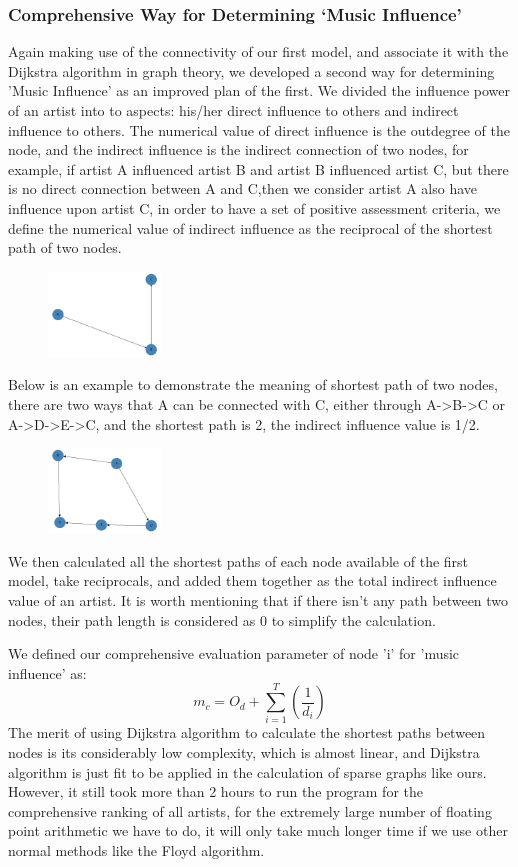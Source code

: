 \documentclass[12pt]{article}
\begin{document}
\subsubsection{Comprehensive Way for Determining `Music Influence'}\quad \;
Again making use of the connectivity of our first model, and associate it with the Dijkstra algorithm in graph theory, we developed a second way for determining 'Music Influence' as an improved plan of the first.
We divided the influence power of an artist into to aspects: his/her direct influence to others and indirect influence to others. The numerical value of direct influence is the outdegree of the node, and the indirect influence is the indirect connection of two nodes, for example, if artist A influenced artist B and artist B influenced artist C, but there is no direct connection between A and C,then we consider artist A also have influence upon artist C, in order to have a set of positive assessment criteria, we define the numerical value of indirect influence as the reciprocal of the shortest path of two nodes.
\begin{figure}[h]
\centering
\includegraphics[width=3cm]{simple graph.png}
\end{figure}


Below is an example to demonstrate the meaning of shortest path of two nodes, there are two ways that A can be connected with C, either through A->B->C or A->D->E->C, and the shortest path is 2, the indirect influence value is 1/2.
\begin{figure}[h]
\centering
\includegraphics[width=3cm]{simple graph2.png}
\end{figure}
We then calculated all the shortest paths of each node available of the first model, take reciprocals, and added them together as the total indirect influence value of an artist. It is worth mentioning that if there isn't any path between two nodes, their path length is considered as 0 to simplify the calculation.

We defined our comprehensive evaluation parameter of node 'i' for 'music influence' as:\[{m_c} = {O_d} + \sum\limits_{i = 1}^T {(\frac{1}{{{d_i}}})} \]\quad\;
The merit of using Dijkstra algorithm to calculate the shortest paths between nodes is its considerably low complexity, which is almost linear, and Dijkstra algorithm is just fit to be applied in the calculation of sparse graphs like ours. However, it still took more than 2 hours to run the program for the comprehensive ranking of all artists, for the extremely large number of floating point arithmetic we have to do, it will only take much longer time if we use other normal methods like the Floyd algorithm. 
\end{document}
